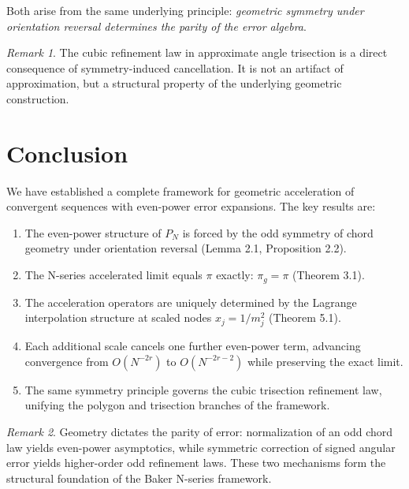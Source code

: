 \documentclass[12pt]{article}
\theoremstyle{remark}
\newtheorem{remark}{Remark}[section]
\begin{document}
Both arise from the same underlying principle: \emph{geometric symmetry
under orientation reversal determines the parity of the error algebra}.

\begin{remark}
The cubic refinement law in approximate angle trisection is a direct consequence
of symmetry-induced cancellation. It is not an artifact of approximation, but a
structural property of the underlying geometric construction.
\end{remark}

\section{Conclusion}

We have established a complete framework for geometric acceleration of
convergent sequences with even-power error expansions. The key results are:

\begin{enumerate}
  \item The even-power structure of $P_N$ is forced by the odd symmetry of
        chord geometry under orientation reversal (Lemma 2.1, Proposition 2.2).
  \item The N-series accelerated limit equals $\pi$ exactly: $\pi_g = \pi$
        (Theorem 3.1).
  \item The acceleration operators are uniquely determined by the Lagrange
        interpolation structure at scaled nodes $x_j = 1/m_j^2$
        (Theorem 5.1).
  \item Each additional scale cancels one further even-power term, advancing
        convergence from $O(N^{-2r})$ to $O(N^{-2r-2})$ while preserving
        the exact limit.
  \item The same symmetry principle governs the cubic trisection refinement
        law, unifying the polygon and trisection branches of the framework.
\end{enumerate}

\begin{remark}
Geometry dictates the parity of error: normalization of an odd chord law
yields even-power asymptotics, while symmetric correction of signed angular
error yields higher-order odd refinement laws. These two mechanisms form the
structural foundation of the Baker N-series framework.
\end{remark}
\end{document}
